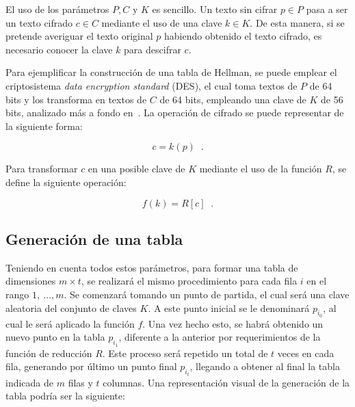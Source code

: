 \documentclass[12pt,spanish,listoffigures,listoftables,listofalgorithms]{tfgetsinf}
\begin{document}
El uso de los parámetros $P, C$ y $K$ es sencillo. Un texto sin cifrar $p \in P$ pasa a ser un texto cifrado $c \in C$ mediante el uso de una clave $k \in K$. De esta manera, si se pretende averiguar el texto original $p$ habiendo obtenido el texto cifrado, es necesario conocer la clave $k$ para descifrar $c$.

Para ejemplificar la construcción de una tabla de Hellman, se puede emplear el criptosistema \textit{data encryption standard} (DES), el cual toma textos de $P$ de 64 bits y los transforma en textos de $C$ de 64 bits, empleando una clave de $K$ de 56 bits, analizado más a fondo en~\cite{DES}. La operación de cifrado se puede representar de la siguiente forma:

\begin{center}
	\begin{equation}
		\tag{1}
		c = k(p)\;\;.
		\label{cifrado}
	\end{equation}
\end{center}

Para transformar $c$ en una posible clave de $K$ mediante el uso de la función $R$, se define la siguiente operación:

\begin{center}
	\begin{equation}
		\tag{2}
		f(k) = R[c]\;\;.
		\label{efe}
	\end{equation}
\end{center}

\subsection{Generación de una tabla}

Teniendo en cuenta todos estos parámetros, para formar una tabla de dimensiones $m \times t$, se realizará el mismo procedimiento para cada fila $i$ en el rango $1,~\dots, m$. Se comenzará tomando un punto de partida, el cual será una clave aleatoria del conjunto de claves $K$. A este punto inicial se le denominará $p_{i_0}$, al cual le será aplicado la función $f$. Una vez hecho esto, se habrá obtenido un nuevo punto en la tabla $p_{i_1}$, diferente a la anterior por requerimientos de la función de reducción $R$. Este proceso será repetido un total de $t$ veces en cada fila, generando por último un punto final $p_{i_t}$, llegando a obtener al final la tabla indicada de $m$ filas y $t$ columnas. Una representación visual de la generación de la tabla podría ser la siguiente:
\end{document}
